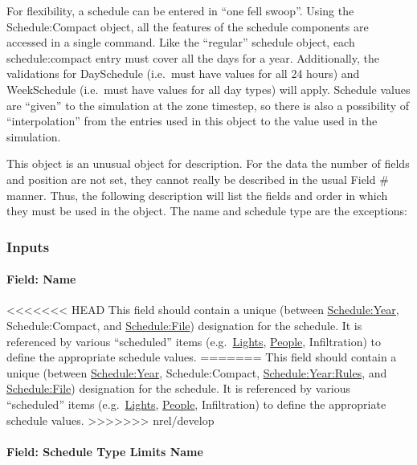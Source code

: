 For flexibility, a schedule can be entered in ``one fell swoop''. Using the Schedule:Compact object, all the features of the schedule components are accessed in a single command. Like the ``regular'' schedule object, each schedule:compact entry must cover all the days for a year. Additionally, the validations for DaySchedule (i.e.~must have values for all 24 hours) and WeekSchedule (i.e.~must have values for all day types) will apply. Schedule values are ``given'' to the simulation at the zone timestep, so there is also a possibility of ``interpolation'' from the entries used in this object to the value used in the simulation.

This object is an unusual object for description. For the data the number of fields and position are not set, they cannot really be described in the usual Field \# manner. Thus, the following description will list the fields and order in which they must be used in the object. The name and schedule type are the exceptions:

\subsubsection{Inputs}\label{inputs-7-023}

\paragraph{Field: Name}\label{field-name-6-019}

<<<<<<< HEAD
This field should contain a unique (between \hyperref[scheduleyear]{Schedule:Year}, Schedule:Compact, and \hyperref[schedulefile]{Schedule:File}) designation for the schedule. It is referenced by various ``scheduled'' items (e.g.~\hyperref[lights-000]{Lights}, \hyperref[people]{People}, Infiltration) to define the appropriate schedule values.
=======
This field should contain a unique (between \hyperref[scheduleyear]{Schedule:Year}, Schedule:Compact, \hyperref[scheduleyearrules]{Schedule:Year:Rules}, and \hyperref[schedulefile]{Schedule:File}) designation for the schedule. It is referenced by various ``scheduled'' items (e.g.~\hyperref[lights-000]{Lights}, \hyperref[people]{People}, Infiltration) to define the appropriate schedule values.
>>>>>>> nrel/develop

\paragraph{Field: Schedule Type Limits Name}\label{field-schedule-type-limits-name-4}

